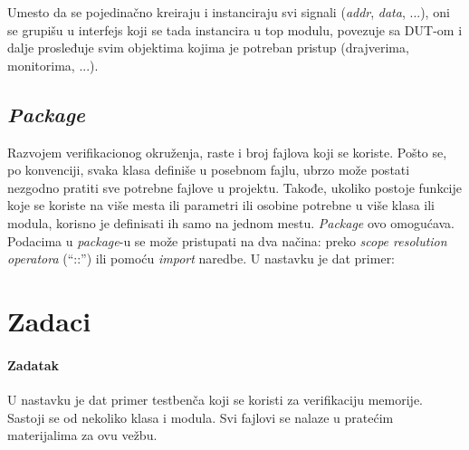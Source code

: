

Umesto da se pojedinačno kreiraju i instanciraju svi signali (\emph{addr},
\emph{data}, ...), oni se grupišu u interfejs koji se tada instancira u top modulu,
povezuje sa DUT-om i dalje prosleđuje svim objektima kojima je potreban pristup
(drajverima, monitorima, ...).


\subsection{\emph{Package}}

Razvojem verifikacionog okruženja, raste i broj fajlova koji se koriste. Pošto
se, po konvenciji, svaka klasa definiše u posebnom fajlu, ubrzo može postati
nezgodno pratiti sve potrebne fajlove u projektu. Takođe, ukoliko postoje
funkcije koje se koriste na više mesta ili parametri ili osobine potrebne u više
klasa ili modula, korisno je definisati ih samo na jednom mestu. \emph{Package}
ovo omogućava.\\

Podacima u \emph{package}-u se može pristupati na dva načina: preko \emph{scope
  resolution operatora} (``::'') ili pomoću \emph{import} naredbe. U nastavku je
dat primer:




\section{Zadaci}

\paragraph{Zadatak}

U nastavku je dat primer testbenča koji se koristi za verifikaciju memorije.
Sastoji se od nekoliko klasa i modula.
Svi fajlovi se nalaze u pratećim materijalima za ovu vežbu.

